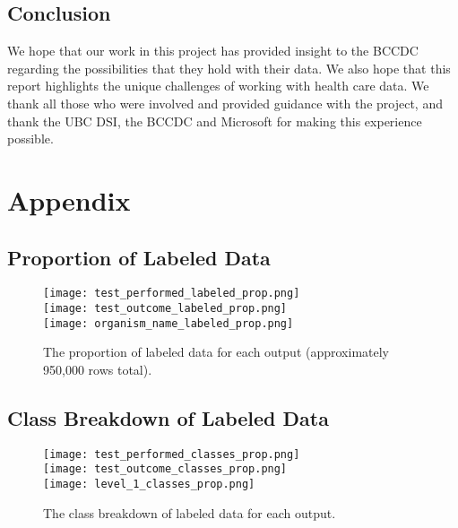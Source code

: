 \documentclass[11pt]{article}
\begin{document}
\subsection{Conclusion} \label{conclusion}

We hope that our work in this project has provided insight to the BCCDC regarding the possibilities that they hold with their data. We also hope that this report highlights the unique challenges of working with health care data. We thank all those who were involved and provided guidance with the project, and thank the UBC DSI, the BCCDC and Microsoft for making this experience possible.

\newpage

\section{Appendix} \label{appendix}


\subsection{Proportion of Labeled Data} \label{proportion of labeled data}

\begin{figure}[H]
    \centering
    \texttt{[image: test\_performed\_labeled\_prop.png]} \\
    \texttt{[image: test\_outcome\_labeled\_prop.png]} \\
    \texttt{[image: organism\_name\_labeled\_prop.png]} \\
    \caption{The proportion of labeled data for each output (approximately 950,000 rows total).}
    \label{proportion of labeled data figure}
\end{figure}


\subsection{Class Breakdown of Labeled Data} \label{class breakdown of labeled data}

\begin{figure}[H]
    \centering
    \texttt{[image: test\_performed\_classes\_prop.png]} \\
    \texttt{[image: test\_outcome\_classes\_prop.png]} \\
    \texttt{[image: level\_1\_classes\_prop.png]} \\
    \caption{The class breakdown of labeled data for each output.}
    \label{class breakdown of labeled data figure}
\end{figure}
\end{document}
